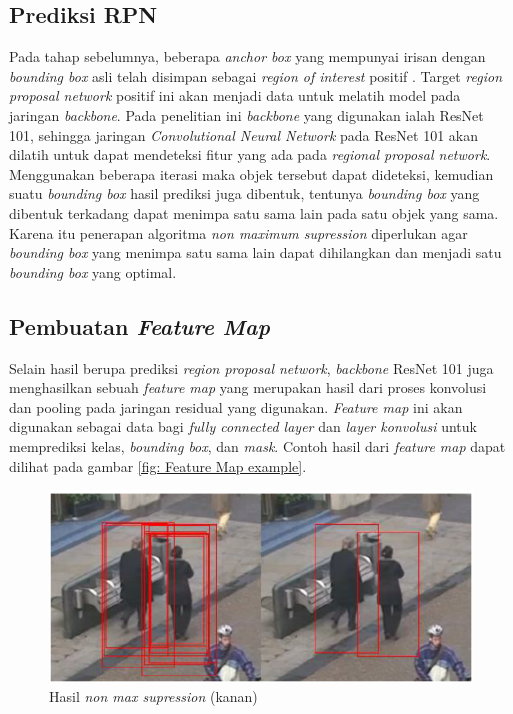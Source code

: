 \subsection{Prediksi RPN}
Pada tahap sebelumnya, beberapa \textit{anchor box} yang mempunyai irisan dengan \textit{bounding box} asli telah
disimpan sebagai \textit{region of interest} positif . Target \textit{region proposal network} positif ini akan 
menjadi data untuk melatih model pada jaringan \textit{backbone}. Pada penelitian ini \textit{backbone} yang
digunakan ialah ResNet 101, sehingga jaringan \textit{Convolutional Neural Network} pada ResNet 101 akan dilatih
untuk dapat mendeteksi fitur yang ada pada \textit{regional proposal network}. Menggunakan beberapa iterasi maka
objek tersebut dapat dideteksi, kemudian suatu \textit{bounding box} hasil prediksi juga dibentuk, tentunya
\textit{bounding box} yang dibentuk terkadang dapat menimpa satu sama lain pada satu objek yang sama. Karena itu
penerapan algoritma \textit{non maximum supression} diperlukan agar \textit{bounding box} yang menimpa satu sama
lain dapat dihilangkan dan menjadi satu \textit{bounding box} yang optimal.

\subsection{Pembuatan \textit{Feature Map}}
Selain hasil berupa prediksi \textit{region proposal network}, \textit{backbone} ResNet 101 juga menghasilkan
sebuah \textit{feature map} yang merupakan hasil dari proses konvolusi dan pooling pada jaringan residual yang
digunakan. \textit{Feature map} ini akan digunakan sebagai data bagi \textit{fully connected layer} dan
\textit{layer konvolusi} untuk memprediksi kelas, \textit{bounding box}, dan \textit{mask}. Contoh hasil dari
\textit{feature map} dapat dilihat pada gambar \ref{fig: Feature Map example}.

\begin{figure}[h!]
  \begin{center}
    \includegraphics[width= 0.7\linewidth]{bab3/Non max suppression.png}
    \caption{Hasil \textit{non max supression} (kanan) \cite{Non_Max_Supression}}
    \label{fig: NMS}
  \end{center}
\end{figure}

